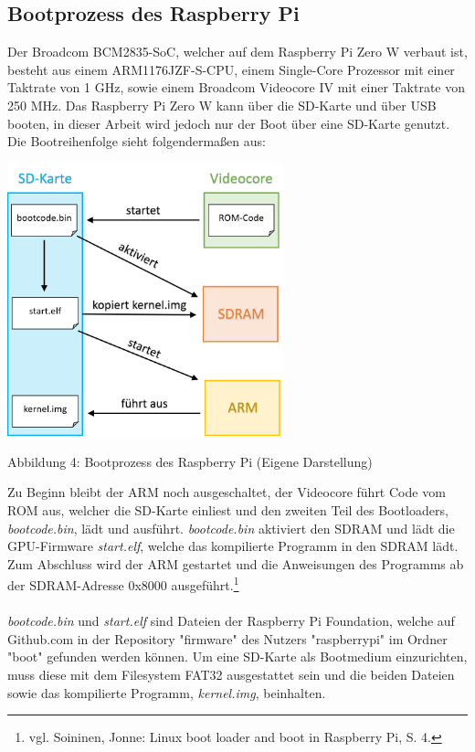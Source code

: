 \documentclass[12pt]{article}
\begin{document}
\subsection{Bootprozess des Raspberry Pi}
Der Broadcom BCM2835-SoC, welcher auf dem Raspberry Pi Zero W verbaut ist, besteht aus einem ARM1176JZF-S-CPU, einem Single-Core Prozessor mit einer Taktrate von 1 GHz, sowie einem Broadcom Videocore IV mit einer Taktrate von 250 MHz. Das Raspberry Pi Zero W kann über die SD-Karte und über USB booten, in dieser Arbeit wird jedoch nur der Boot über eine SD-Karte genutzt. Die Bootreihenfolge sieht folgendermaßen aus:
\begin{center}
\includegraphics[width=0.6\textwidth]{img/bootloader.png}
\end{center}
\begin{center}
Abbildung 4: Bootprozess des Raspberry Pi (Eigene Darstellung)
\end{center}
Zu Beginn bleibt der ARM noch ausgeschaltet, der Videocore führt Code vom ROM aus, welcher die SD-Karte einliest und den zweiten Teil des Bootloaders, \textit{bootcode.bin}, lädt und ausführt. \textit{bootcode.bin} aktiviert den SDRAM und lädt die GPU-Firmware \textit{start.elf}, welche das kompilierte Programm in den SDRAM lädt. Zum Abschluss wird der ARM gestartet und die Anweisungen des Programms ab der SDRAM-Adresse 0x8000 ausgeführt.\footnote{\selectfont vgl. Soininen, Jonne: Linux boot loader and boot in Raspberry Pi, S. 4.}
\\\\\textit{bootcode.bin} und \textit{start.elf} sind Dateien der Raspberry Pi Foundation, welche auf Github.com in der Repository "firmware" des Nutzers "raspberrypi" im Ordner "boot" gefunden werden können. Um eine SD-Karte als Bootmedium einzurichten, muss diese mit dem Filesystem FAT32 ausgestattet sein und die beiden Dateien sowie das kompilierte Programm, \textit{kernel.img}, beinhalten.
\end{document}
